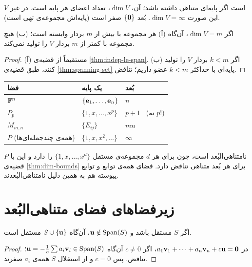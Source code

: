 \begin{definition}[بُعد]
$V$  است اگر پایه‌ای متناهی داشته باشد؛  آن، $\dim V$، تعداد اعضای هر پایه است. در غیر این صورت $\dim V=\infty$. بُعد $\{\mathbf{0}\}$ صفر است (پایه‌اش مجموعه‌ی تهی است).
\end{definition}

\begin{theorem}\label{thm:dim-bounds}
اگر $\dim V=m$، آن‌گاه (آ) هر مجموعه با بیش از $m$ بردار وابسته است؛ (ب) هیچ مجموعه با کمتر از $m$ بردار $V$ را تولید نمی‌کند.
\end{theorem}
\begin{proof}
(آ) مستقیماً از قضیه‌ی \ref{thm:indep-le-span}. (ب) اگر $k<m$ بردار $V$ را تولید کنند، طبق قضیه‌ی \ref{thm:spanning-set} پایه‌ای با حداکثر $k<m$ عضو داریم؛ تناقض.
\end{proof}

\begin{center}
\renewcommand{\arraystretch}{1.3}
\begin{tabular}{lll}
\toprule
\textbf{فضا} & \textbf{یک پایه} & \textbf{بُعد}\\
\midrule
$\mathbb{F}^n$ & $\{\mathbf{e}_1,\dots,\mathbf{e}_n\}$ & $n$\\
$P_p$ & $\{1,x,\dots,x^p\}$ & $p+1$ \ \textcolor{warncolor}{(نه $p$!)}\\
$M_{m,n}$ & $\{E_{ij}\}$ & $mn$\\
$P$ (همه‌ی چندجمله‌ای‌ها) & $\{1,x,x^2,\dots\}$ & $\infty$\\
\bottomrule
\end{tabular}
\end{center}
$P$ نامتناهی‌البُعد است، چون برای هر $d$ مجموعه‌ی مستقل $\{1,x,\dots,x^d\}$ را دارد و این با قضیه‌ی \ref{thm:dim-bounds} برای هر بُعد متناهی تناقض دارد. فضای همه‌ی توابع و توابع پیوسته هم به همین دلیل نامتناهی‌البُعدند.

\section{زیرفضاهای فضای متناهی‌البُعد}

\begin{lemma}\label{lem:adjoin}
اگر $S$ مستقل باشد و $\mathbf{u}\notin\operatorname{Span}(S)$، آن‌گاه $S\cup\{\mathbf{u}\}$ مستقل است.
\end{lemma}
\begin{proof}
در $a_1\mathbf{v}_1+\dots+a_n\mathbf{v}_n+c\mathbf{u}=\mathbf{0}$، اگر $c\neq0$ آن‌گاه $\mathbf{u}=-\frac1c\sum a_i\mathbf{v}_i\in\operatorname{Span}(S)$؛ تناقض. پس $c=0$ و از استقلال $S$ همه‌ی $a_i$ صفرند.
\end{proof}

